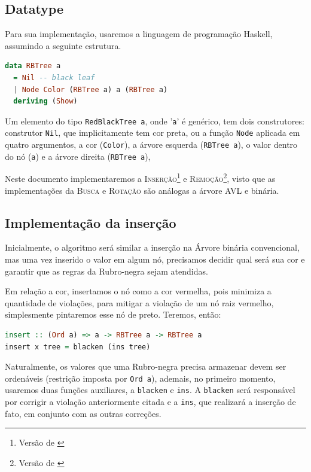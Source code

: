 \subsection{Datatype}

Para sua implementação, usaremos a linguagem de programação Haskell, assumindo a seguinte estrutura.

\begin{lstlisting}[language=haskell, caption={Árvore Rubro-Negra}]
data RBTree a
  = Nil -- black leaf
  | Node Color (RBTree a) a (RBTree a)
  deriving (Show)
\end{lstlisting}

Um elemento do tipo \texttt{RedBlackTree a}, onde '\texttt{a}' é genérico, tem dois construtores: construtor \texttt{Nil}, que implicitamente tem cor preta, ou a função \texttt{Node} aplicada em quatro argumentos, a cor (\texttt{Color}), a árvore esquerda (\texttt{RBTree a}), o valor dentro do nó (\texttt{a}) e a árvore direita (\texttt{RBTree a}),

Neste documento implementaremos a \textrm{I\textsc{nserção}}\footnote{Versão de \cite{okasaki1999functional}} e \textrm{R\textsc{emoção}}\footnote{Versão de \cite{germane2014deletion}}, visto que as implementações da \textrm{B\textsc{usca}} e \textrm{R\textsc{otação}} são análogas a árvore AVL e binária.

\subsection{Implementação da inserção}


Inicialmente, o algoritmo será similar a inserção na Árvore binária convencional, mas uma vez inserido o valor em algum nó, precisamos decidir qual será sua cor e garantir que as regras da Rubro-negra sejam atendidas.

Em relação a cor, insertamos o nó como a cor vermelha, pois minimiza a quantidade de violações, para mitigar a violação de um nó raiz vermelho, simplesmente pintaremos esse nó de preto. Teremos, então:

\begin{lstlisting}[language=haskell, caption={Função principal}]
insert :: (Ord a) => a -> RBTree a -> RBTree a
insert x tree = blacken (ins tree)
\end{lstlisting}
\FloatBarrier

Naturalmente, os valores que uma Rubro-negra precisa armazenar devem ser ordenáveis (restrição imposta por \texttt{Ord a}), ademais, no primeiro momento, usaremos duas funções auxiliares, a \texttt{blacken} e \texttt{ins}. A \texttt{blacken} será responsável por corrigir a violação anteriormente citada e a \texttt{ins}, que realizará a inserção de fato, em conjunto com as outras correções.

